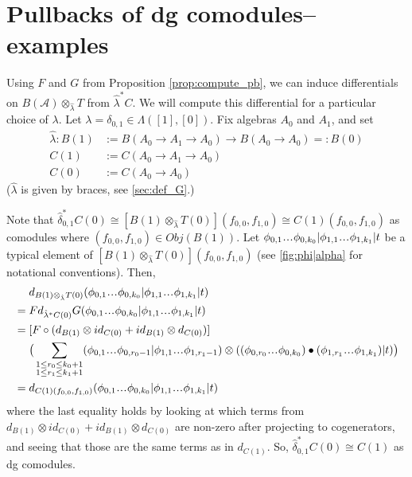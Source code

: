 \section{Pullbacks of dg comodules--examples}
%
\begin{eg} \label{eg:pb}
Using $F$ and $G$ from Proposition 
\ref{prop:compute_pb}, we can induce 
differentials on $B(\mathcal{A}) \otimes_{\hat{\lambda}} T$ from
$\hat{\lambda}^*C$. We will compute this differential 
for a particular choice of $\lambda$. 
Let $\lambda = \delta_{0,1} \in \Lambda([1], [0])$. 
Fix algebras $A_0$ and $A_1$, and set 
\begin{align*}
\hat{\lambda}: B(1) 
&:= B(A_0 \to A_1 \to A_0) \to 
  B(A_0 \to A_0) =: B(0)\\
C(1) 
&:= C(A_0 \to A_1 \to A_0)\\
C(0) 
&:= C(A_0 \to A_0)
\end{align*}
($\hat{\lambda}$ is given by braces, 
see \ref{sec:def_G}.)

Note that 
$\hat{\delta}_{0,1}^* C(0) \cong
[B(1) \otimes_{\hat{\lambda}} 
  T(0)](f_{0,0},f_{1,0}) \cong
C(1)(f_{0,0},f_{1,0})$ 
as comodules where 
$(f_{0,0},f_{1,0}) \in Obj(B(1))$. 
Let 
$\phi_{0,1} \smdots \phi_{0,k_0} |
\phi_{1,1} \smdots \phi_{1,k_1} |
t$ be a typical element of 
$[B(1) \otimes_{\hat{\lambda}} 
  T(0)](f_{0,0},f_{1,0})$
(see \ref{fig:phi|alpha} for notational 
conventions). Then,
\begin{align*}
& \phantom{{}={}}
d_{B(1) \otimes_{\hat{\lambda}} T(0)}
(\phi_{0,1} \smdots \phi_{0,k_0} |
\phi_{1,1} \smdots \phi_{1,k_1} | t)\\
&=
Fd_{\hat{\lambda}^*C(0)}G
(\phi_{0,1} \smdots \phi_{0,k_0} |
\phi_{1,1} \smdots \phi_{1,k_1} | t) \\
&=
[F \circ (d_{B(1)}\otimes id_{C(0)} + 
  id_{B(1)} \otimes d_{C(0)})] \\
& \phantom{{}=  {}}
\big( \sum \limits_{\substack{1 \leq r_0 \leq k_0+1 \\ 
1 \leq r_1 \leq k_1+1}}
(\phi_{0,1} \smdots \phi_{0,r_0-1} |
\phi_{1,1} \smdots \phi_{1,r_1-1} ) \otimes 
((\phi_{0,r_0}\smdots \phi_{0,k_0}) \bullet 
(\phi_{1,r_1}\smdots \phi_{1,k_1}) | t) \big) \\
&= 
d_{C(1)(f_{0,0},f_{1,0})}
(\phi_{0,1} \smdots \phi_{0,k_0} |
\phi_{1,1} \smdots \phi_{1,k_1} | t)
\end{align*}
where the last equality holds by looking at which 
terms from $d_{B(1)}\otimes id_{C(0)} + 
id_{B(1)} \otimes d_{C(0)}$ 
are non-zero after projecting to cogenerators, and 
seeing that those are the same terms as in 
$d_{C(1)}$. So, $\hat{\delta}_{0,1}^*C(0) \cong C(1)$ as 
dg comodules. 
\end{eg}
